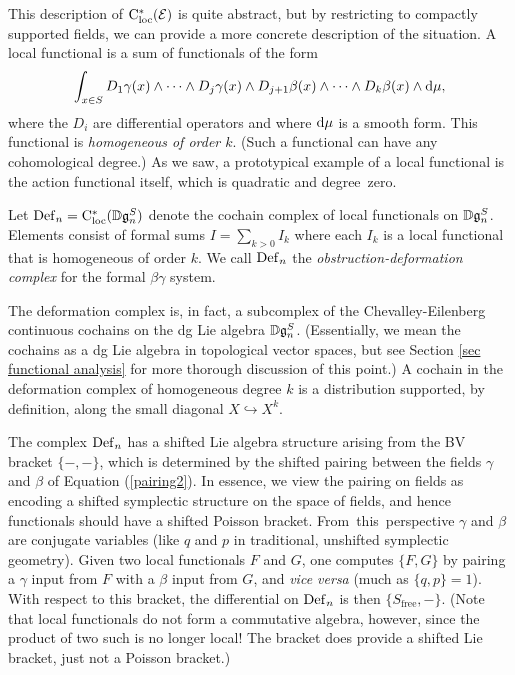 This description of ${\rm C}_{\rm loc}^*(\mathcal E)$ is quite abstract, but 
by restricting to compactly supported fields, we can provide a more concrete description of the situation. 
A local functional is a sum of functionals of the form
\[
\int_{x \in S} D_1\gamma(x) \wedge \cdots \wedge D_j\gamma(x) \wedge D_{j+1}\beta(x) \wedge\cdots \wedge D_k\beta(x)\wedge {\rm d} \mu,
\]
where the $D_i$ are differential operators and where ${\rm d}\mu$ is a smooth form.
This functional is {\em homogeneous of order $k$}.
(Such a functional can have any cohomological degree.)
As we saw, a prototypical example of a local functional is the action functional itself, which is quadratic and degree~zero.

\begin{dfn}
Let ${\rm Def}_n = {\rm C}_{\rm loc}^*(\mathbb D \mathfrak g_n^S)$ denote the cochain complex of local functionals on $\mathbb D \mathfrak g_n^S$.
Elements consist of formal sums $I = \sum_{k > 0} I_k$ where each $I_k$ is a local functional that is homogeneous of order $k$. We call ${\rm Def}_n$ the {\em obstruction-deformation complex} for the formal $\beta\gamma$ system.
\end{dfn}

The deformation complex is, in fact, a subcomplex of the Chevalley-Eilenberg continuous cochains on the dg Lie algebra $\mathbb D \mathfrak g_n^S$. 
(Essentially, we mean the cochains as a dg Lie algebra in topological vector spaces, but 
see Section \ref{sec functional analysis} for more thorough discussion of this point.)
A cochain in the deformation complex of homogeneous degree $k$ is a distribution supported, by definition, along the small diagonal $X \hookrightarrow X^k$.

The complex ${\rm Def}_n$ has a shifted Lie algebra structure arising from the BV bracket $\{-,-\}$,
which is determined by the shifted pairing between the fields $\gamma$ and $\beta$ of Equation (\ref{pairing2}).
In essence, we view the pairing on fields as encoding a shifted symplectic structure on the space of fields,
and hence functionals should have a shifted Poisson bracket. \si 
From this perspective $\gamma$ and $\beta$ are conjugate variables (like $q$ and $p$ in traditional, unshifted symplectic geometry).
Given two local functionals $F$ and $G$, one computes $\{F,G\}$ by pairing a $\gamma$ input from $F$ with a $\beta$ input from $G$, and {\it vice versa} (much as $\{q,p\} = 1$).
With respect to this bracket, the differential on ${\rm Def}_n$ is then $\{S_{\text{free}},-\}$.
(Note that local functionals do not form a commutative algebra, however, since the product of two such is no longer local!
The bracket does provide a shifted Lie bracket, just not a Poisson bracket.)

